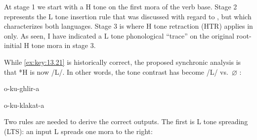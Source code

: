 \documentclass[output=paper]{langsci/langscibook}
\begin{document}
\begin{exe}
\end{exe}
At stage 1 we start with a H tone on the first mora of the verb base. Stage 2
represents the L tone insertion rule that was discussed with regard to ,
but which characterizes both languages. Stage 3 is where H tone retraction
(\gls{HTR}) applies in  only. As seen, I have indicated a L
tone phonological “trace” on the original root-initial H tone mora in stage 3.

While \eqref{ex:key:13.21} is historically correct, the proposed synchronic
analysis is that *H is now /L/. In other words, the  tone contrast has
become /L/ vs.\ $\varnothing$ \citep{Hyman2018}:

\begin{exe}\ex\label{ex:key:13.22}
    \begin{minipage}[t]{.50\textwidth}
        \begin{xlist}
             o-ku-ghlir-a  
        \end{xlist}
    \end{minipage}
    \begin{minipage}[t]{.50\textwidth}
         o-ku-klakat-a  
    \end{minipage}
\end{exe}
Two rules are needed to derive the correct outputs. The first is L tone
spreading (LTS): an input L spreads one mora to the right:
\end{document}
